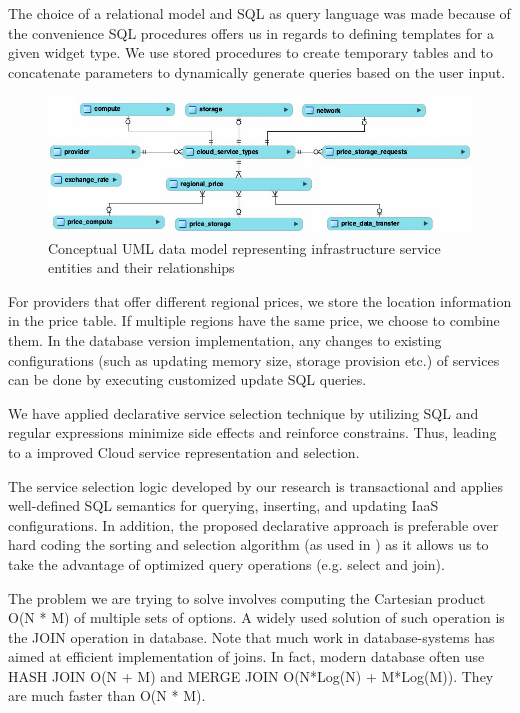 The choice of a relational model and SQL as query language was made because of the convenience SQL procedures offers us in regards to defining templates for a given widget type. We use stored procedures to create temporary tables and to concatenate parameters to dynamically generate queries based on the user input.

\begin{figure}
  \includegraphics[width=\textwidth,keepaspectratio]{Figures/system/CloudRecommender/uml.jpg}
  \caption{Conceptual UML data model representing infrastructure service entities and their relationships}
  \label{fig:uml}
\end{figure}

For providers that offer different regional prices, we store the location information in the price table.
If multiple regions have the same price, we choose to combine them.
In the database version implementation, any changes to existing configurations (such as updating memory size, storage provision etc.) of services can be done by executing customized update SQL queries.

We have applied declarative service
selection technique by utilizing SQL and regular expressions
minimize side effects and reinforce constrains. Thus, leading
to a improved Cloud service representation and selection.

The service selection logic developed by our research is
transactional and applies well-defined SQL semantics for
querying, inserting, and updating IaaS configurations. In
addition, the proposed declarative approach is preferable
over hard coding the sorting and selection algorithm (as used
in \cite{Ruiz-AlvarezCloudStorageSelection})
as it allows us to take the advantage of optimized
query operations (e.g. select and join). 

The problem we are
trying to solve involves computing the Cartesian product
O(N * M) of multiple sets of options. A widely used solution
of such operation is the JOIN operation in database. Note
that much work in database-systems has aimed
at efficient implementation of joins. In fact, modern database
often use HASH JOIN O(N + M) and MERGE JOIN
O(N*Log(N) + M*Log(M)). They are much faster than O(N
* M).

